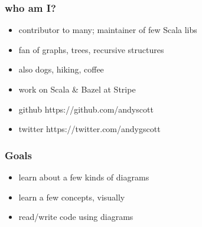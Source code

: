 \documentclass[include/preamble.tex]{subfiles}
\begin{document}
{
  \begin{frame}
    \frametitle{who am I?}
    \begin{itemize}
      \pause
    \item contributor to many; maintainer of few Scala libs
    \item fan of graphs, trees, recursive structures
    \item also dogs, hiking, coffee
    \item work on Scala \& Bazel at Stripe
      \newline
      \pause
    \item github https://github.com/andyscott
    \item twitter https://twitter.com/andygscott
    \end{itemize}
  \end{frame}
}

\begin{frame}
  \frametitle{Goals}
  \begin{itemize}
  \item learn about a few kinds of diagrams
  \item learn a few concepts, visually
  \item read/write code using diagrams
  \end{itemize}
\end{frame}
\end{document}
